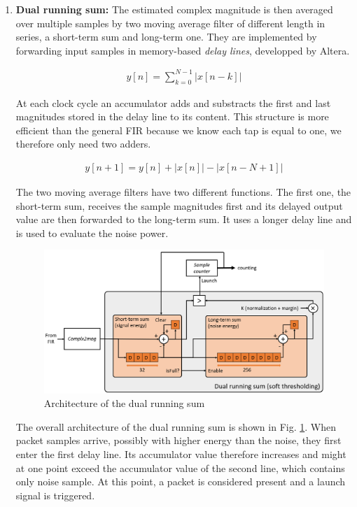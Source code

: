 \begin{enumerate}
    \item \textbf{Dual running sum: } The estimated complex magnitude is then averaged over multiple samples by two moving average filter of different length in series, a short-term sum and long-term one. They are implemented by forwarding input samples in  memory-based \textit{delay lines}, developped by Altera. 

    \begin{align}
            y[n] = \sum_{k=0}^{N-1}\left|x[n-k]\right|
    \end{align}

    At each clock cycle an accumulator adds and substracts the first and last magnitudes stored in the delay line to its content. This structure is more efficient than the general FIR because we know each tap is equal to one, we therefore only need two adders. 

    \begin{align}
            y[n+1] = y[n] + \left|x[n]\right| - \left|x[n-N+1]\right|
    \end{align}

    The two moving average filters have two different functions. The first one, the short-term sum, receives the sample magnitudes first and its delayed output value are then forwarded to the long-term sum. It uses a longer delay line and is used to evaluate the noise power. 

    \begin{figure}[h]
        \centering
        \includegraphics[width=\linewidth]{figures/dual_running_sum_block.png}
        \caption{Architecture of the dual running sum}
        \label{fig:dual_runnign_sum}
    \end{figure}
    
    The overall architecture of the dual running sum is shown in Fig. \ref{fig:dual_runnign_sum}. When packet samples arrive, possibly with  higher energy than the noise, they first enter the first delay line. Its accumulator value therefore increases and might at one point exceed the accumulator value of the second line, which contains only noise sample. At this point, a packet is considered present and a launch signal is triggered. 


\end{enumerate}
